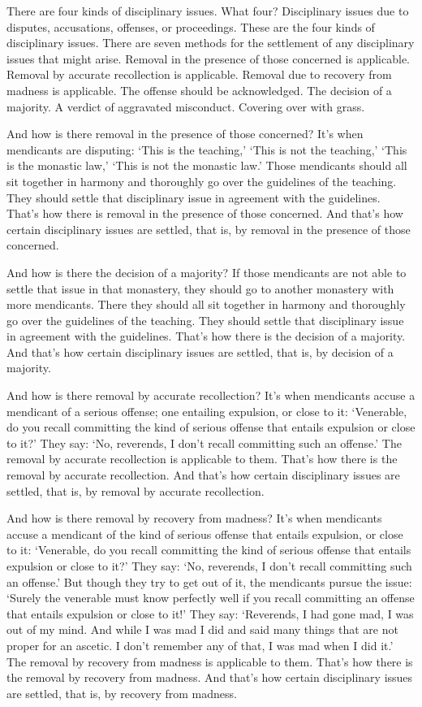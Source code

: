 \documentclass[12pt,openany]{book}%
\begin{document}
There are four kinds of disciplinary issues. What four? Disciplinary issues due to disputes, accusations, offenses, or proceedings. These are the four kinds of disciplinary issues. There are seven methods for the settlement of any disciplinary issues that might arise. Removal in the presence of those concerned is applicable. Removal by accurate recollection is applicable. Removal due to recovery from madness is applicable. The offense should be acknowledged. The decision of a majority. A verdict of aggravated misconduct. Covering over with grass. 

And how is there removal in the presence of those concerned? It’s when mendicants are disputing: ‘This is the teaching,’ ‘This is not the teaching,’ ‘This is the monastic law,’ ‘This is not the monastic law.’ Those mendicants should all sit together in harmony and thoroughly go over the guidelines of the teaching. They should settle that disciplinary issue in agreement with the guidelines. That’s how there is removal in the presence of those concerned. And that’s how certain disciplinary issues are settled, that is, by removal in the presence of those concerned. 

And how is there the decision of a majority? If those mendicants are not able to settle that issue in that monastery, they should go to another monastery with more mendicants. There they should all sit together in harmony and thoroughly go over the guidelines of the teaching. They should settle that disciplinary issue in agreement with the guidelines. That’s how there is the decision of a majority. And that’s how certain disciplinary issues are settled, that is, by decision of a majority. 

And how is there removal by accurate recollection? It’s when mendicants accuse a mendicant of a serious offense; one entailing expulsion, or close to it: ‘Venerable, do you recall committing the kind of serious offense that entails expulsion or close to it?’ They say: ‘No, reverends, I don’t recall committing such an offense.’ The removal by accurate recollection is applicable to them. That’s how there is the removal by accurate recollection. And that’s how certain disciplinary issues are settled, that is, by removal by accurate recollection. 

And how is there removal by recovery from madness? It’s when mendicants accuse a mendicant of the kind of serious offense that entails expulsion, or close to it: ‘Venerable, do you recall committing the kind of serious offense that entails expulsion or close to it?’ They say: ‘No, reverends, I don’t recall committing such an offense.’ But though they try to get out of it, the mendicants pursue the issue: ‘Surely the venerable must know perfectly well if you recall committing an offense that entails expulsion or close to it!’ They say: ‘Reverends, I had gone mad, I was out of my mind. And while I was mad I did and said many things that are not proper for an ascetic. I don’t remember any of that, I was mad when I did it.’ The removal by recovery from madness is applicable to them. That’s how there is the removal by recovery from madness. And that’s how certain disciplinary issues are settled, that is, by recovery from madness. 
\end{document}
